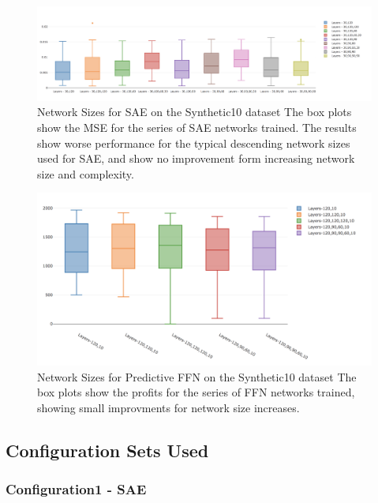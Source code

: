 \documentclass[a4paper,11pt,oneside]{article}
\theoremstyle{plain}
\theoremstyle{definition}
\begin{document}
	\begin{figure}[H]
	\centering \includegraphics[scale=0.3]{images/iteration_four/it4_sae_layers.png}
	\caption{Network Sizes for SAE on the Synthetic10 dataset \newline The box plots show the MSE for the series of SAE networks trained. The results show worse performance for the typical descending network sizes used for SAE, and show no improvement form increasing network size and complexity.}
	\label{figure-appendix-it4_sae_layers}
	\end{figure}
	
	\begin{figure}[H]
		\centering \includegraphics[scale=0.3]{images/iteration_four/it4_ffn_network_size.png}
		\caption{Network Sizes for Predictive FFN on the Synthetic10 dataset \newline The box plots show the profits for the series of FFN networks trained, showing small improvments for network size increases.}
		\label{figure-appendix-it4_ffn_network_size}
	\end{figure}

\subsection{Configuration Sets Used}

\subsubsection{Configuration1 - SAE}\label{config1}
\end{document}
